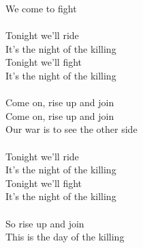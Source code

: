 \documentclass[11pt]{article}
\begin{document}
We come to fight\\
\\
Tonight we'll ride\\
It's the night of the killing\\
Tonight we'll fight\\
It's the night of the killing\\
\\
Come on, rise up and join\\
Come on, rise up and join\\
Our war is to see the other side\\
\\
Tonight we'll ride\\
It's the night of the killing\\
Tonight we'll fight\\
It's the night of the killing\\
\\
So rise up and join\\
This is the day of the killing\\
\end{document}
